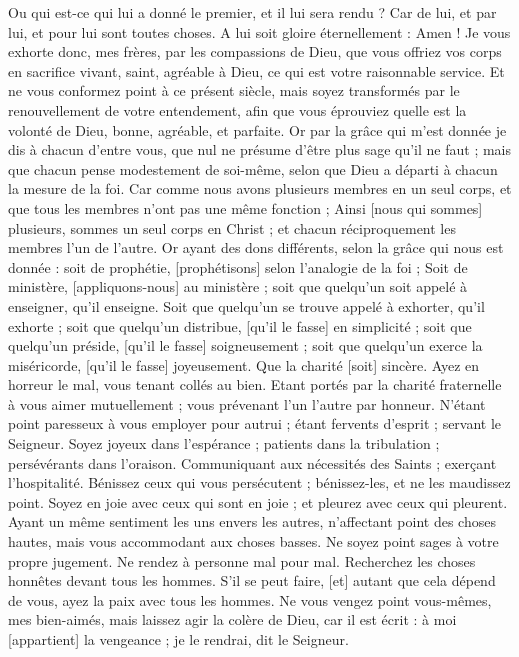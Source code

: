 \begin{multicols}{2}
Ou qui est-ce qui lui a donné le premier, et il lui sera rendu ?
Car de lui, et par lui, et pour lui sont toutes choses. A lui soit gloire éternellement : Amen !
\VerseOne{}Je vous exhorte donc, mes frères, par les compassions de Dieu, que vous offriez vos corps en sacrifice vivant, saint, agréable à Dieu, ce qui est votre raisonnable service.
Et ne vous conformez point à ce présent siècle, mais soyez transformés par le renouvellement de votre entendement, afin que vous éprouviez quelle est la volonté de Dieu, bonne, agréable, et parfaite.
Or par la grâce qui m'est donnée je dis à chacun d'entre vous, que nul ne présume d'être plus sage qu'il ne faut ; mais que chacun pense modestement de soi-même, selon que Dieu a départi à chacun la mesure de la foi.
Car comme nous avons plusieurs membres en un seul corps, et que tous les membres n'ont pas une même fonction ;
Ainsi [nous qui sommes] plusieurs, sommes un seul corps en Christ ; et chacun réciproquement les membres l'un de l'autre.
Or ayant des dons différents, selon la grâce qui nous est donnée : soit de prophétie, [prophétisons] selon l'analogie de la foi ;
Soit de ministère, [appliquons-nous] au ministère ; soit que quelqu'un soit appelé à enseigner, qu'il enseigne.
Soit que quelqu'un se trouve appelé à exhorter, qu'il exhorte ; soit que quelqu'un distribue, [qu'il le fasse] en simplicité ; soit que quelqu'un préside, [qu'il le fasse] soigneusement ; soit que quelqu'un exerce la miséricorde, [qu'il le fasse] joyeusement.
Que la charité [soit] sincère. Ayez en horreur le mal, vous tenant collés au bien.
Etant portés par la charité fraternelle à vous aimer mutuellement ; vous prévenant l'un l'autre par honneur.
N'étant point paresseux à vous employer pour autrui ; étant fervents d'esprit ; servant le Seigneur.
Soyez joyeux dans l'espérance ; patients dans la tribulation ; persévérants dans l'oraison.
Communiquant aux nécessités des Saints ; exerçant l'hospitalité.
Bénissez ceux qui vous persécutent ; bénissez-les, et ne les maudissez point.
Soyez en joie avec ceux qui sont en joie ; et pleurez avec ceux qui pleurent.
Ayant un même sentiment les uns envers les autres, n'affectant point des choses hautes, mais vous accommodant aux choses basses. Ne soyez point sages à votre propre jugement.
Ne rendez à personne mal pour mal. Recherchez les choses honnêtes devant tous les hommes.
S'il se peut faire, [et] autant que cela dépend de vous, ayez la paix avec tous les hommes.
Ne vous vengez point vous-mêmes, mes bien-aimés, mais laissez agir la colère de Dieu, car il est écrit : à moi [appartient] la vengeance ; je le rendrai, dit le Seigneur.

\end{multicols}
